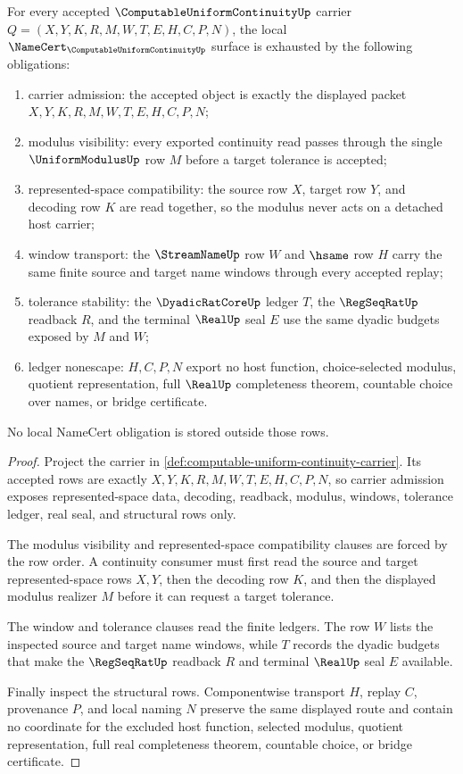 \begin{theorem}
\label{thm:computable-uniform-continuity-namecert-obligations}
For every accepted $\ComputableUniformContinuityUp$ carrier $Q=(X,Y,K,R,M,W,T,E,H,C,P,N)$, the local $\NameCert_{\ComputableUniformContinuityUp}$ surface is exhausted by the following obligations:
\begin{enumerate}
\item carrier admission: the accepted object is exactly the displayed packet $X,Y,K,R,M,W,T,E,H,C,P,N$;
\item modulus visibility: every exported continuity read passes through the single $\UniformModulusUp$ row $M$ before a target tolerance is accepted;
\item represented-space compatibility: the source row $X$, target row $Y$, and decoding row $K$ are read together, so the modulus never acts on a detached host carrier;
\item window transport: the $\StreamNameUp$ row $W$ and $\hsame$ row $H$ carry the same finite source and target name windows through every accepted replay;
\item tolerance stability: the $\DyadicRatCoreUp$ ledger $T$, the $\RegSeqRatUp$ readback $R$, and the terminal $\RealUp$ seal $E$ use the same dyadic budgets exposed by $M$ and $W$;
\item ledger nonescape: $H,C,P,N$ export no host function, choice-selected modulus, quotient representation, full $\RealUp$ completeness theorem, countable choice over names, or bridge certificate.
\end{enumerate}
No local NameCert obligation is stored outside those rows.
\end{theorem}
\begin{proof}
Project the carrier in \autoref{def:computable-uniform-continuity-carrier}. Its accepted rows are exactly $X,Y,K,R,M,W,T,E,H,C,P,N$, so carrier admission exposes represented-space data, decoding, readback, modulus, windows, tolerance ledger, real seal, and structural rows only.

The modulus visibility and represented-space compatibility clauses are forced by the row order. A continuity consumer must first read the source and target represented-space rows $X,Y$, then the decoding row $K$, and then the displayed modulus realizer $M$ before it can request a target tolerance.

The window and tolerance clauses read the finite ledgers. The row $W$ lists the inspected source and target name windows, while $T$ records the dyadic budgets that make the $\RegSeqRatUp$ readback $R$ and terminal $\RealUp$ seal $E$ available.

Finally inspect the structural rows. Componentwise transport $H$, replay $C$, provenance $P$, and local naming $N$ preserve the same displayed route and contain no coordinate for the excluded host function, selected modulus, quotient representation, full real completeness theorem, countable choice, or bridge certificate.
\end{proof}

